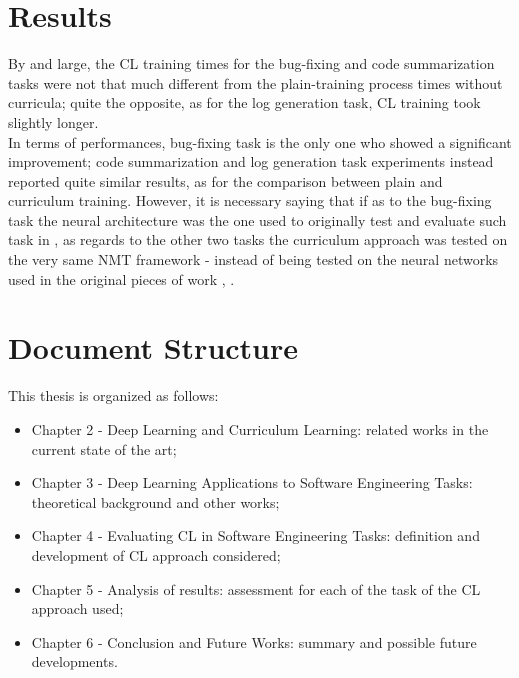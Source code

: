 \section{Results}
By and large, the CL training times for the bug-fixing 
and code summarization tasks were not that much different from
the plain-training process times without curricula; quite the opposite, as for the log generation task, CL training took slightly longer.\\
In terms of performances, bug-fixing task is the only one who showed a significant improvement; code summarization and log generation 
task experiments instead reported quite similar results, as for the comparison between plain and curriculum training.
However, it is necessary saying that if as to the bug-fixing task the neural architecture was the one 
used to originally test and evaluate such task in \cite{Tufano2019}, as regards to the other two tasks 
the curriculum approach was tested on the very same NMT framework - instead of being 
tested on the neural networks used in the original pieces of work \cite{Leclair2020}, \cite{Mastropaolo2022}.

\section{Document Structure}
This thesis is organized as follows:
\begin{itemize}
    \item Chapter 2 - Deep Learning and Curriculum Learning: related works in the current state of the art;
    \item Chapter 3 - Deep Learning Applications to Software Engineering Tasks: theoretical background and other works;
    \item Chapter 4 - Evaluating CL in Software Engineering Tasks: definition and development of CL approach considered;
    \item Chapter 5 - Analysis of results: assessment for each of the task of the CL approach used;
    \item Chapter 6 - Conclusion and Future Works: summary and possible future developments.
\end{itemize}